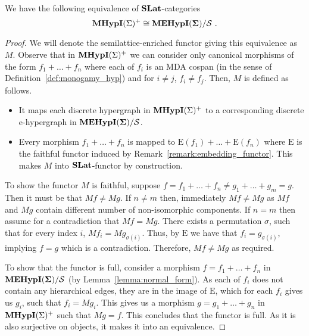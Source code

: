 \begin{lemma}

    We have the following equivalence of $\mathbf{SLat}$-categories
    \[
    \textbf{MHypI}(\Sigma)^{+} \cong {\mathbf{MEHypI(\Sigma)}}/\mathcal{S}~.
    \]
    \end{lemma}
    \begin{proof}
    We will denote the semilattice-enriched functor giving this equivalence as $M$.
    Observe that in $\textbf{MHypI}(\Sigma)^{+}$ we can consider only canonical morphisms of the form $f_{1} + \ldots + f_{n}$ where each of $f_{i}$ is an MDA cospan (in the sense of Definition~\ref{def:monogamy_hyp}) and for $i \not = j$, $f_{i} \not = f_{j}$.
    Then, $M$ is defined as follows.
    \begin{itemize}
    \item It maps each discrete hypergraph in $\textbf{MHypI}(\Sigma)^{+}$ to a corresponding discrete e-hypergraph in ${\mathbf{MEHypI(\Sigma)}}/\mathcal{S}$.
    \item Every morphism $f_{1} + \ldots + f_{n}$ is mapped to $\text{E}(f_{1}) + \ldots + \text{E}(f_{n})$ where $\text{E}$ is the faithful functor induced by Remark~\ref{remark:embedding_functor}.
          This makes $M$ into $\mathbf{SLat}$-functor by construction.
    \end{itemize}
    To show the functor $M$ is faithful, suppose $f = f_{1} + \ldots + f_{n} \not = g_{1} + \ldots + g_{m} = g$.
    Then it must be that $Mf \not = Mg$.
    If $n \not = m$ then, immediately $Mf \not = Mg$ as $Mf$ and $Mg$ contain different number of non-isomorphic components.
    If $n = m$ then assume for a contradiction that $Mf = Mg$. 
    There exists a permutation $\sigma$, such that for every index $i$, $Mf_{i} = Mg_{\sigma(i)}$.
    Thus, by $\text{E}$ we have that $f_{i} = g_{\sigma(i)}$, implying $f = g$ which is a contradiction.
    Therefore, $Mf \not = Mg$ as required.
    
    To show that the functor is full, consider a morphism $f = f_{1} + \ldots + f_{n}$ in ${\mathbf{MEHypI(\Sigma)}} / \mathcal{S}$ (by Lemma~\ref{lemma:normal_form}). 
    As each of $f_{i}$ does not contain any hierarchical edges, they are in the image of $\text{E}$, which for each $f_{i}$ gives us $g_{i}$, such that $f_{i} = Mg_{i}$.
    This gives us a morphism $g = g_{1} + \ldots + {g_{n}}$ in $\textbf{MHypI}(\Sigma)^{+}$ such that $Mg = f$.
    This concludes that the functor is full.
    As it is also surjective on objects, it makes it into an equivalence.
\end{proof}
    

